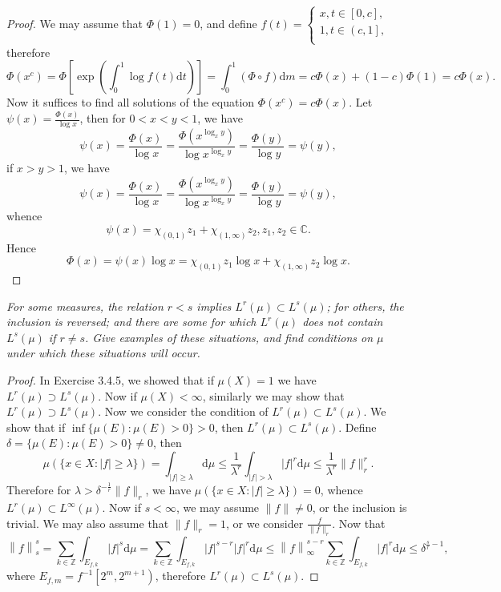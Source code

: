\begin{proof}
We may assume that $\Phi(1)=0$, and define $f\left( t \right) =\begin{cases}
	x,t\in \left[ 0,c \right] ,\\
	1,t\in \left( c,1 \right] ,\\
\end{cases}$therefore 
$$
\Phi \left( x^c \right) =\Phi \left[ \exp \left( \int_0^1{\log f\left( t \right) \mathrm{d}t} \right) \right] =\int_0^1{\left( \Phi \circ f \right) \mathrm{d}m}=c\Phi \left( x \right) +\left( 1-c \right) \Phi \left( 1 \right) =c\Phi \left( x \right) .
$$
Now it suffices to find all solutions of the equation $\Phi(x^c)=c\Phi(x)$. Let $\psi(x)=\frac{\Phi(x)}{\log x}$, then for $0<x<y<1$, we have 
$$
\psi \left( x \right) =\frac{\Phi \left( x \right)}{\log x}=\frac{\Phi \left( x^{\log _xy} \right)}{\log x^{\log _xy}}=\frac{\Phi \left( y \right)}{\log y}=\psi \left( y \right) ,
$$
if $x>y>1$, we have 
$$
\psi \left( x \right) =\frac{\Phi \left( x \right)}{\log x}=\frac{\Phi \left( x^{\log _xy} \right)}{\log x^{\log _xy}}=\frac{\Phi \left( y \right)}{\log y}=\psi \left( y \right) ,
$$
whence 
$$
\psi \left( x \right) =\chi _{\left( 0,1 \right)}z_1+\chi _{\left( 1,\infty \right)}z_2,z_1,z_2\in \mathbb{C} .
$$
Hence 
$$
\Phi \left( x \right) =\psi \left( x \right) \log x=\chi _{\left( 0,1 \right)}z_1\log x+\chi _{\left( 1,\infty \right)}z_2\log x.
$$
\end{proof}
\begin{problem}\em
For some measures, the relation $r<s$ implies $L^r(\mu)\subset L^s(\mu)$; for others, the inclusion is reversed; and there are some for which $L^r(\mu)$ does not contain $L^s(\mu)$ if $r\ne s$. Give examples of these situations, and find conditions on $\mu$ under which these situations will occur.
\end{problem}
\begin{proof}
In Exercise 3.4.5, we showed that if $\mu(X)=1$ we have $L^r(\mu)\supset L^s(\mu)$. Now if $\mu(X)<\infty$, similarly we may show that $L^r(\mu)\supset L^s(\mu)$. Now we consider the condition of $L^r(\mu)\subset L^s(\mu)$. We show that if $\inf\{\mu(E):\mu(E)>0\}>0$, then $L^r(\mu)\subset L^s(\mu)$. Define $\delta=\{\mu(E):\mu(E)>0\}\ne 0$, then 
$$\mu(\{x\in X:|f|\ge\lambda\})=\int_{|f|\ge\lambda}\mathrm{d}\mu\le\frac{1}{\lambda^r}\int_{|f|>\lambda}|f|^r\mathrm{d}\mu\le\frac{1}{\lambda^r}\|f\|_r^r.$$
Therefore for $\lambda>\delta^{-\frac{1}{r}}\|f\|_r$, we have $\mu(\{x\in X:|f|\ge\lambda\})=0$, whence $L^r(\mu)\subset L^\infty(\mu)$. Now if $s<\infty$, we may assume $\|f\|\ne 0$, or the inclusion is trivial. We may also assume that $\|f\|_r=1$, or we consider $\frac{f}{\|f\|_r}$. Now that 
$$
\left\| f \right\| _{s}^{s}=\sum_{k\in \mathbb{Z}}{\int_{E_{f,k}}{\left| f \right|^s\mathrm{d}\mu}}=\sum_{k\in \mathbb{Z}}{\int_{E_{f,k}}{\left| f \right|^{s-r}\left| f \right|^r\mathrm{d}\mu}}\le \left\| f \right\| _{\infty}^{s-r}\sum_{k\in \mathbb{Z}}{\int_{E_{f,k}}{\left| f \right|^r\mathrm{d}\mu}}\le \delta ^{\frac{s}{r}-1},
$$
where $E_{f,m}=f^{-1}\left[ 2^m,2^{m+1} \right) $, therefore $L^r(\mu)\subset L^s(\mu)$.
\end{proof}
